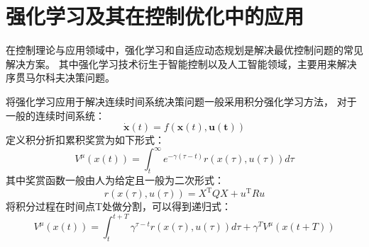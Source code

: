 \section{强化学习及其在控制优化中的应用}
在控制理论与应用领域中，强化学习\cite{Sutton2018}和自适应动态规划\cite{powell2007approximate,zhang2012adaptive}是解决最优控制问题的常见解决方案。
其中强化学习技术衍生于智能控制以及人工智能领域，主要用来解决序贯马尔科夫决策问题。

将强化学习应用于解决连续时间系统决策问题一般采用积分强化学习方法，
对于一般的连续时间系统：
\begin{equation}
    \dot{\mathbf{x}}(t)=f(\mathbf{x}(t), \mathbf{u}(\mathbf{t}))
\end{equation}
定义积分折扣累积奖赏为如下形式：
\begin{equation}
    V^\mu(x(t))=\int_t^{\infty} e^{-\gamma(\tau-t)} r(x(\tau), u(\tau)) d \tau
 \end{equation}
其中奖赏函数一般由人为给定且一般为二次形式：
 \begin{equation}
    r(x(\tau), u(\tau))=X^{\mathrm{T}} Q X+u^{\mathrm{T}} R u
\end{equation}
将积分过程在时间点T处做分割，可以得到递归式：
\begin{equation}
    V^\mu(x(t))=\int_t^{t+T} \gamma^{\tau-t} r(x(\tau), u(\tau)) d \tau+\gamma^T V^\mu(x(t+T))
    \end{equation}

